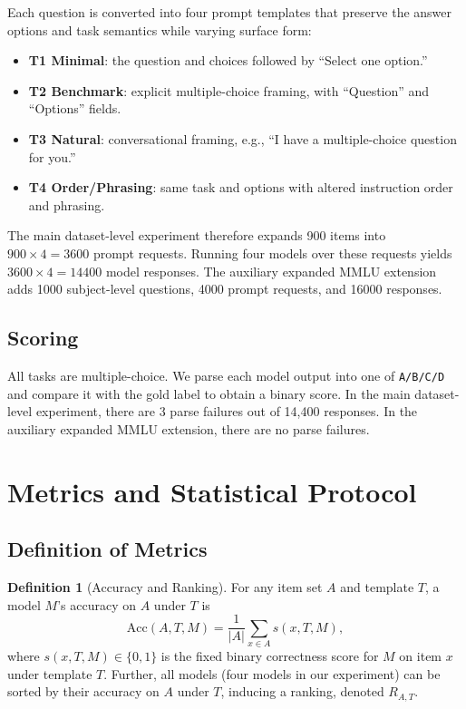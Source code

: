 \documentclass[11pt]{article}
\theoremstyle{definition}
\newtheorem{definition}{Definition}
\begin{document}
Each question is converted into four prompt templates that preserve the answer options and task semantics while varying surface form:
\begin{itemize}[label={}]
    \item \textbf{T1 Minimal}: the question and choices followed by ``Select one option.''
    \item \textbf{T2 Benchmark}: explicit multiple-choice framing, with ``Question'' and ``Options'' fields.
    \item \textbf{T3 Natural}: conversational framing, e.g., ``I have a multiple-choice question for you.''
    \item \textbf{T4 Order/Phrasing}: same task and options with altered instruction order and phrasing.
\end{itemize}

The main dataset-level experiment therefore expands 900 items into $900 \times 4 = 3600$ prompt requests. Running four models over these requests yields $3600 \times 4 = 14400$ model responses. The auxiliary expanded MMLU extension adds 1000 subject-level questions, 4000 prompt requests, and 16000 responses.

\subsection{Scoring}

All tasks are multiple-choice. We parse each model output into one of \texttt{A/B/C/D} and compare it with the gold label to obtain a binary score. In the main dataset-level experiment, there are 3 parse failures out of 14,400 responses. In the auxiliary expanded MMLU extension, there are no parse failures.

\section{Metrics and Statistical Protocol}

\subsection{Definition of Metrics}

\begin{definition}[Accuracy and Ranking]
    For any item set $A$ and template $T$, a model $M$'s accuracy on $A$ under $T$ is
    \[
    \mathrm{Acc}(A,T,M) = \frac{1}{|A|}\sum_{x\in A} s(x,T,M),
    \]
    where $s(x,T,M)\in\{0,1\}$ is the fixed binary correctness score for $M$ on item $x$ under template $T$. Further, all models (four models in our experiment) can be sorted by their accuracy on $A$ under $T$, inducing a ranking, denoted $R_{A,T}$.
\end{definition}
\end{document}
